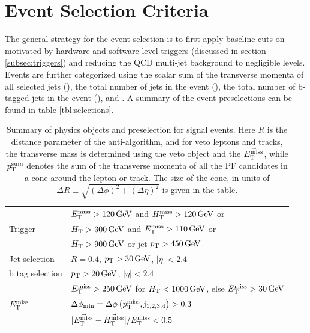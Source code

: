 \section{Event Selection Criteria}
\label{sec:eventSelection}
The general strategy for the event selection is to first apply baseline cuts on motivated by hardware and software-level triggers (discussed in section \ref{subsec:triggers}) and reducing the QCD multi-jet background to negligible levels. Events are further categorized using the scalar sum of the transverse momenta \pt of all selected jets (\HT), the total number of jets in the event (\nj), the total number of b-tagged jets in the event (\nb), and \mttwo. A summary of the event preselections can be found in table \ref{tbl:selections}.
\begin{table}
	\centering
	\renewcommand{\baselinestretch}{1.0}
	\caption[Summary of physics objects and preselection for signal events.]{Summary of physics objects and preselection for signal events. Here $R$ is the distance parameter of the anti-\kt algorithm, and for veto leptons and tracks, the transverse mass \Mt is determined using the veto object and the $\vec{E_{\mathrm{T}}^{\text{miss}}}$, while $p_{\mathrm{T}}^{\mathrm{sum}}$ denotes the sum of the transverse momenta of all the PF candidates in a cone around the lepton or track. The size of the cone, in units of $\Delta R \equiv \sqrt{\left(\Delta \phi\right)^2 + \left(\Delta \eta\right)^2}$ is given in the table. }
	 \begin{tabular}{ l | l }
      \hline
      \multirow{3}{*}{Trigger} & $E_{\mathrm{T}}^{\text{miss}}>120\,\text{Ge\hspace{-.08em}V}$ and $H_{\mathrm{T}}^{\mathrm{miss}}>120\,\text{Ge\hspace{-.08em}V}$ or \\
      & $H_{\mathrm{T}}>300\,\text{Ge\hspace{-.08em}V}$ and $E_{\mathrm{T}}^{\text{miss}}>110\,\text{Ge\hspace{-.08em}V}$ or \\
      & $H_{\mathrm{T}}>900\,\text{Ge\hspace{-.08em}V}$ or jet $p_{\mathrm{T}}>450\,\text{Ge\hspace{-.08em}V}$ \\  \hline
      Jet selection & $R=0.4$, $p_{\mathrm{T}}>30\,\text{Ge\hspace{-.08em}V}$, $|\eta|<2.4$ \\ \hline
      b tag selection & $p_{\mathrm{T}}>20\,\text{Ge\hspace{-.08em}V}$, $|\eta|<2.4$ \\  \hline
      \multirow{3}{*}{$E_{\mathrm{T}}^{\text{miss}}$} & $E_{\mathrm{T}}^{\text{miss}}>250\,\text{Ge\hspace{-.08em}V}$ for $H_{\mathrm{T}}<1000\,\text{Ge\hspace{-.08em}V}$,
      else $E_{\mathrm{T}}^{\text{miss}}>30\,\text{Ge\hspace{-.08em}V}$\\ 
      & $\Delta\phi_{\mathrm{min}} = \Delta\phi\left(p_{\mathrm{T}}^{\mathrm{miss}},\rm{j}_{\mathrm{1,2,3,4}}\right)>0.3$ \\
      & $|\vec{E_{\mathrm{T}}^{\text{miss}}}-\vec{H_{\mathrm{T}}^{\mathrm{miss}}}|/E_{\mathrm{T}}^{\text{miss}}<0.5$ \\ \hline

\end{tabular}
\end{table}
